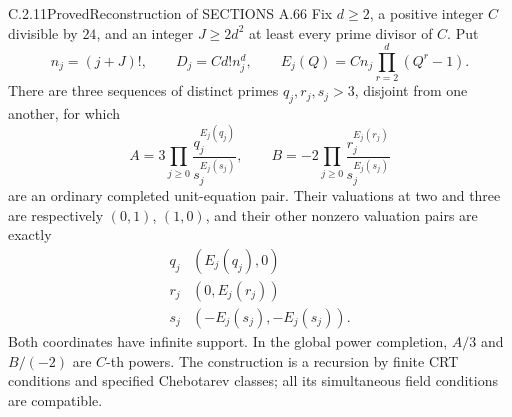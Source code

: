 \begin{result}{C.2.11}{Proved}{Reconstruction of SECTIONS A.66}
\label{thm:ghost-general-exponent-arithmetic}
Fix \(d\ge2\), a positive integer \(C\) divisible
by \(24\), and an integer \(J\ge2d^2\) at least
every prime divisor of \(C\). Put
\[
 n_j=(j+J)!,\qquad D_j=Cd!n_j^d,\qquad
 E_j(Q)=Cn_j\prod_{r=2}^d(Q^r-1).
 \tag{VX.6}
\]
There are three sequences of distinct primes
\(q_j,r_j,s_j>3\), disjoint from one another,
for which
\[
 A=3\prod_{j\ge0}\frac{q_j^{E_j(q_j)}}{s_j^{E_j(s_j)}},
 \qquad
 B=-2\prod_{j\ge0}\frac{r_j^{E_j(r_j)}}{s_j^{E_j(s_j)}}
 \tag{VX.7}
\]
are an ordinary completed unit-equation pair.
Their valuations at two and three are respectively
\((0,1)\), \((1,0)\), and their other nonzero
valuation pairs are exactly
\[
 \begin{array}{c|c}
 q_j&(E_j(q_j),0)\\
 r_j&(0,E_j(r_j))\\
 s_j&(-E_j(s_j),-E_j(s_j)).
 \end{array}
 \tag{VX.8}
\]
Both coordinates have infinite support. In the global
power completion, \(A/3\) and \(B/(-2)\) are
\(C\)-th powers. The construction is a recursion
by finite CRT conditions and specified Chebotarev
classes; all its simultaneous field conditions are
compatible.
\end{result}

